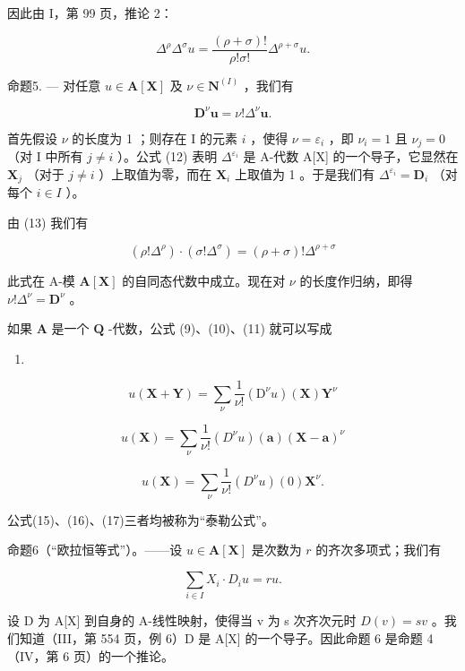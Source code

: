 因此由 I，第 99 页，推论 2：

\[
\Delta^ {\rho} \Delta^ {\sigma} u = \frac {(\rho + \sigma) !}{\rho ! \sigma !} \Delta^ {\rho + \sigma} u.\tag{13}
\]

命题5. --- 对任意 \(u \in \mathbf{A}[\mathbf{X}]\) 及 \(\nu \in \mathbf{N}^{(I)}\) ，我们有

\[
\mathbf {D} ^ {\nu} \boldsymbol {u} = \nu ! \Delta^ {\nu} \boldsymbol {u}.
\]

首先假设 \(\nu\) 的长度为 1 ；则存在 I 的元素 \(i\) ，使得 \(\nu = \varepsilon_i\) ，即 \(\nu_i = 1\) 且 \(\nu_j = 0\) （对 I 中所有 \(j \neq i\) ）。公式 (12) 表明 \(\Delta^{\varepsilon_i}\) 是 A-代数 A{[}X{]} 的一个导子，它显然在 \(\mathbf{X}_j\) （对于 \(j \neq i\) ）上取值为零，而在 \(\mathbf{X}_i\) 上取值为 1 。于是我们有 \(\Delta^{\varepsilon_i} = \mathbf{D}_i\) （对每个 \(i \in I\) ）。

由 (13) 我们有

\[
(\rho ! \Delta^ {\rho}) \cdot (\sigma ! \Delta^ {\sigma}) = (\rho + \sigma)! \Delta^ {\rho + \sigma}\tag{14}
\]

此式在 A-模 \(\mathbf{A}[\mathbf{X}]\) 的自同态代数中成立。现在对 \(\nu\) 的长度作归纳，即得 \(\nu! \Delta^{\nu} = \mathbf{D}^{\nu}\) 。

如果 \(\mathbf{A}\) 是一个 \(\mathbf{Q}\) -代数，公式 (9)、(10)、(11) 就可以写成

\begin{enumerate}
\def\labelenumi{(\arabic{enumi})}
\setcounter{enumi}{14}
\tightlist
\item
\end{enumerate}

\[
u (\mathbf {X} + \mathbf {Y}) = \sum_ {\nu} \frac {1}{\nu !} (\mathrm{D} ^ {\nu} u) (\mathbf {X}) \mathbf {Y} ^ {\nu}
\]

\[
u (\mathbf {X}) = \sum_ {\nu} \frac {1}{\nu !} (D ^ {\nu} u) (\mathbf {a}) (\mathbf {X} - \mathbf {a}) ^ {\nu}\tag{16}
\]

\[
u (\mathbf {X}) = \sum_ {\nu} \frac {1}{\nu !} (D ^ {\nu} u) (0) \mathbf {X} ^ {\nu}.\tag{17}
\]

公式(15)、(16)、(17)三者均被称为“泰勒公式”。

命题6（“欧拉恒等式”）。——设 \(u \in \mathbf{A}[\mathbf{X}]\) 是次数为 \(r\) 的齐次多项式；我们有

\[
\sum_ {i \in I} X _ {i} \cdot D _ {i} u = r u.
\]

设 D 为 A{[}X{]} 到自身的 A-线性映射，使得当 v 为 s 次齐次元时 \(D(v) = sv\) 。我们知道（III，第 554 页，例 6）D 是 A{[}X{]} 的一个导子。因此命题 6 是命题 4（IV，第 6 页）的一个推论。

